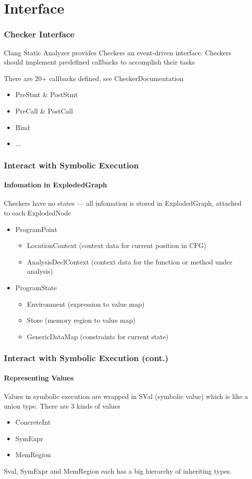 \documentclass[]{beamer}
\begin{document}
\section{Interface}
\frame{\tableofcontents[currentsection]}

\begin{frame}
  \frametitle{Checker Interface}
  Clang Static Analyzer provides Checkers an \alert{event-driven}
  interface. Checkers should implement predefined \alert{callbacks}
  to accomplish their tasks

  \pause
  There are 20+ callbacks defined, see \alert{CheckerDocumentation}
  \begin{itemize}
    \item PreStmt \& PostStmt
    \item PreCall \& PostCall
    \item Bind
    \item ...
  \end{itemize}
\end{frame}

\begin{frame}
  \frametitle{Interact with Symbolic Execution}
  \framesubtitle{Infomation in ExplodedGraph}
  Checkers have no states --- all infomation is stored
  in \alert{ExplodedGraph}, attached to each \alert{ExplodedNode}
  \pause
  \begin{itemize}
    \item \alert{ProgramPoint}
      \begin{itemize}
        \item LocationContext (context data for current position in CFG)
        \item AnalysisDeclContext (context data for the function
          or method under analysis)
      \end{itemize}
    \item \alert{ProgramState}
      \begin{itemize}
        \item \alert{Environment} (expression to value map)
        \item Store (memory region to value map)
        \item GenericDataMap (constraints for current state)
      \end{itemize}
  \end{itemize}
\end{frame}

\begin{frame}
  \frametitle{Interact with Symbolic Execution (cont.)}
  \framesubtitle{Representing Values}
  Values in symbolic execution are wrapped in \alert{SVal} (symbolic
  value) which is like a union type. There are 3 kinds of values
  \pause
  \begin{itemize}
    \item ConcreteInt
    \item SymExpr
    \item MemRegion
  \end{itemize}

  \pause
  \alert{Sval}, \alert{SymExpr} and \alert{MemRegion} each has
  a big hierarchy of inheriting types.
\end{frame}
\end{document}
